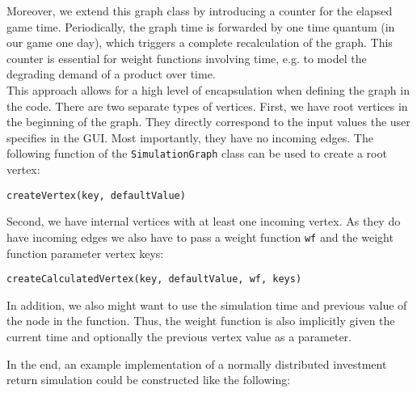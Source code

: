 Moreover, we extend this graph class by introducing a counter for the elapsed game time. Periodically, the graph time is forwarded by one time quantum (in our game one day), which triggers a complete recalculation of the graph. This counter is essential for weight functions involving time, e.g. to model the degrading demand of a product over time.
\\


This approach allows for a high level of encapsulation when defining the graph in the code. There are two separate types of vertices. First, we have root vertices in the beginning of the graph. They directly correspond to the input values the user specifies in the GUI. Most importantly, they have no incoming edges. The following function of the \texttt{SimulationGraph} class can be used to create a root vertex:

\begin{center}
	\texttt{createVertex(key, defaultValue)}
\end{center}

Second, we have internal vertices with at least one incoming vertex. As they do have incoming edges we also have to pass a weight function \texttt{wf} and the weight function parameter vertex keys:
\begin{center}
	\texttt{createCalculatedVertex(key, defaultValue, wf, keys)}
\end{center}
 
 In addition, we also might want to use the simulation time and previous value of the node in the function. Thus, the weight function is also implicitly given the current time and optionally the previous vertex value as a parameter.
 
 In the end, an example implementation of a normally distributed investment return simulation could be constructed like the following:\\
 
